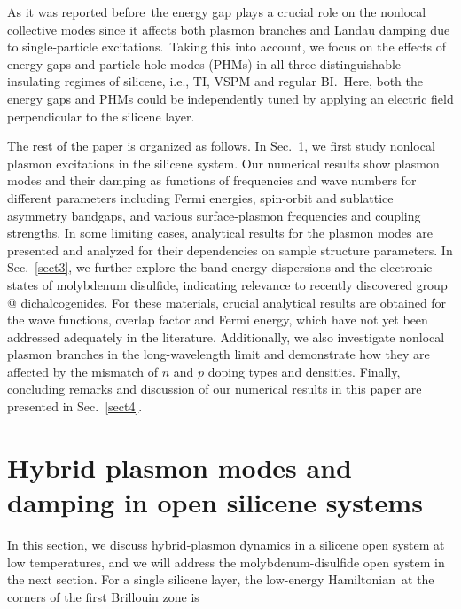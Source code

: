 \documentclass[aps,prb,showpacs]{revtex4}
\makeatletter
\newcommand*{\rom}[1]{\expandafter\@slowromancap\romannumeral #1@}
\makeatother
\begin{document}
As it was reported before\,\cite{ourPRB15} the energy gap plays a crucial role on the nonlocal collective modes since it affects both
plasmon branches and Landau damping due to single-particle excitations.\,\cite{pavlo1} Taking
this into account, we focus on the effects of energy gaps and particle-hole modes (PHMs) in all three distinguishable insulating regimes of silicene, 
i.e., TI, VSPM and regular BI.\,\cite{ezawa,ezawaprl,ezawa9prl,SilMain}
Here, both the energy gaps and PHMs could be independently tuned by applying an electric field perpendicular to the silicene layer.
\medskip

The rest of the paper is organized as follows. In Sec.\ \ref{sect2}, we first study nonlocal plasmon excitations in the silicene system.
Our numerical results show plasmon modes and their damping as functions of frequencies and wave numbers for different parameters including Fermi
energies, spin-orbit and sublattice asymmetry bandgaps, and various surface-plasmon frequencies and coupling strengths. In some limiting cases, analytical results for the plasmon modes are presented
and analyzed for their dependencies on sample structure parameters. In Sec.\ \ref{sect3}, we further explore the
band-energy dispersions and the electronic states of molybdenum disulfide, indicating relevance to recently discovered group \rom{4} dichalcogenides. 
For these materials, crucial analytical results are obtained for the wave functions, overlap factor and Fermi energy,
which have not yet been addressed adequately in the literature. Additionally, we also investigate nonlocal plasmon branches
in the long-wavelength limit and demonstrate how they are affected by the mismatch of $n$ and $p$ doping types and densities. Finally, concluding remarks and discussion
of our numerical results in this paper are presented in Sec.\ \ref{sect4}.

\section{Hybrid plasmon modes and damping in open silicene systems}
\label{sect2}

In this section, we discuss hybrid-plasmon dynamics in a silicene open system at low temperatures, and we will address the molybdenum-disulfide open system in the next section.
For a single silicene layer, the low-energy Hamiltonian\,\cite{SilMain,EzawaR,TN30,ezawa,ezawaprl} at the corners of the first Brillouin zone is
\end{document}
